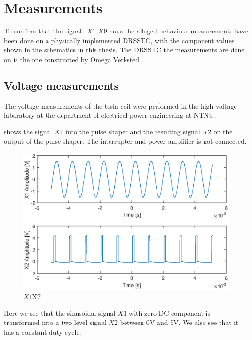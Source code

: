 
\chapter{Measurements}
To confirm that the signals $X1$-$X9$ have the alleged behaviour measurements have been done on a physically implemented DRSSTC, with the component values shown in the schematics in this thesis. The DRSSTC the measurements are done on is the one constructed by Omega Verksted \citep{prosjektoppgave} \citep{githubtesla}.


\section{Voltage measurements}
The voltage measurements of the tesla coil were performed in the high voltage laboratory at the department of electrical power engineering at NTNU.

 shows the signal $X1$ into the pulse shaper and the resulting signal $X2$ on the output of the pulse shaper. The interrupter and power amplifier is not connected.

\begin{figure}[H]
    \centering
    \includegraphics[trim={1cm 0cm 1cm 0cm},clip,width=\textwidth]{img/X1-X2.eps}
    \caption{$X1 $X2}
    \label{fig:m_x1-x2}
\end{figure}

Here we see that the sinusoidal signal $X1$ with zero DC component is transformed into a two level signal $X2$ between 0V and 5V. We also see that it has a constant duty cycle.


